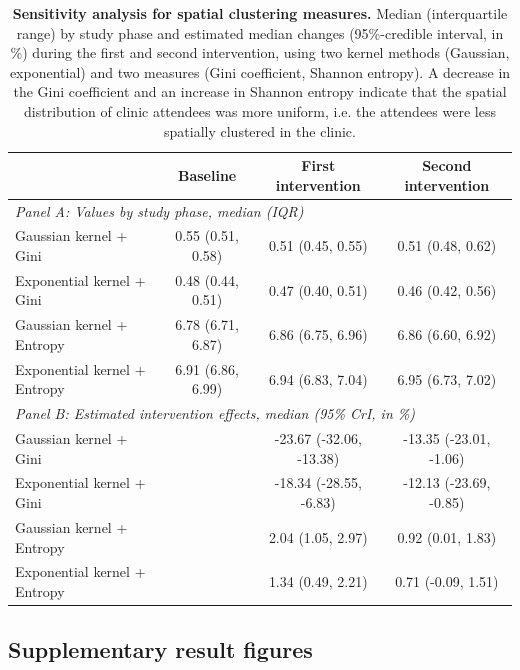 \documentclass[11pt]{article}
\begin{document}
\clearpage

\begin{table}[ht]
\centering
\caption{\textbf{Sensitivity analysis for spatial clustering measures.} Median (interquartile range) by study phase and estimated median changes (95\%-credible interval, in \%) during the first and second intervention, using two kernel methods (Gaussian, exponential) and two measures (Gini coefficient, Shannon entropy). A decrease in the Gini coefficient and an increase in Shannon entropy indicate that the spatial distribution of clinic attendees was more uniform, i.e. the attendees were less spatially clustered in the clinic.}
\label{tab:S2}
\small
\begin{tabular}{l ccc}
\toprule
 & Baseline & First intervention & Second intervention \\
\midrule
\multicolumn{4}{l}{\textit{Panel A: Values by study phase, median (IQR)}} \\
[0.5ex]
Gaussian kernel + Gini & 0.55 (0.51, 0.58) & 0.51 (0.45, 0.55) & 0.51 (0.48, 0.62) \\
Exponential kernel + Gini & 0.48 (0.44, 0.51) & 0.47 (0.40, 0.51) & 0.46 (0.42, 0.56) \\
Gaussian kernel + Entropy & 6.78 (6.71, 6.87) & 6.86 (6.75, 6.96) & 6.86 (6.60, 6.92) \\
Exponential kernel + Entropy & 6.91 (6.86, 6.99) & 6.94 (6.83, 7.04) & 6.95 (6.73, 7.02) \\
[1ex]
\multicolumn{4}{l}{\textit{Panel B: Estimated intervention effects, median (95\% CrI, in \%)}} \\
[0.5ex]
Gaussian kernel + Gini &  & -23.67 (-32.06, -13.38) & -13.35 (-23.01, -1.06) \\
Exponential kernel + Gini &  & -18.34 (-28.55, -6.83) & -12.13 (-23.69, -0.85) \\
Gaussian kernel + Entropy &  & 2.04 (1.05, 2.97) & 0.92 (0.01, 1.83) \\
Exponential kernel + Entropy &  & 1.34 (0.49, 2.21) & 0.71 (-0.09, 1.51) \\
\bottomrule
\end{tabular}
\end{table}

\clearpage

\subsection{Supplementary result figures}\label{supplementary-result-figures}
\end{document}
